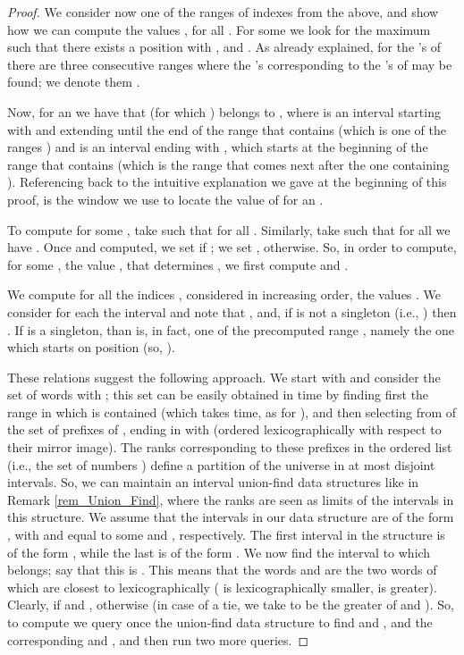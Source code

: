 \documentclass[final]{dmtcs-episciences}
\begin{document}
\begin{proof}
We consider now one of the ranges of indexes  from the above, and show how we can compute the values , for all . For some  we look for the maximum  such that there exists a position  with , and . As already explained, for the 's of  there are three consecutive ranges where the 's corresponding to the 's of  may be found; we denote them . 

Now, for an  we have that  (for which ) belongs to , where  is an interval starting with  and extending until the end of the range that contains  (which is one of the ranges ) and  is an interval ending with , which starts at the beginning of the range that contains  (which is the range that comes next after the one containing ). Referencing back to the intuitive explanation we gave at the beginning of this proof,  is the window we use to locate the value of  for an .  

To compute  for some , take  such that  for all . Similarly, take  such that for all  we have . Once  and  computed, we set  if ; we set , otherwise. So, in order to compute, for some , the value , that determines ,  we first compute  and .

We compute for all the indices , considered in increasing order, the values . 
We consider for each  the interval  and note that , and, if  is not a singleton (i.e., ) then . 
If  is a singleton, than  is, in fact, one of the precomputed range , namely the one which starts on position  (so, ). 
 
These relations suggest the following approach. We start with  and consider the set of words  with ; this set can be easily obtained in  time by finding first the range  in which  is contained (which takes  time, as  for ), and then selecting from  of the set of prefixes  of , ending in  with  (ordered lexicographically with respect to their mirror image). The ranks corresponding to these prefixes in the ordered list  (i.e., the set of numbers ) define a partition of the universe  in at most  disjoint intervals. So, we can maintain an interval union-find data structures like in Remark \ref{rem_Union_Find}, where the ranks are seen as limits of the intervals in this structure. We assume that the intervals in our data structure are of the form , with  and  equal to some  and , respectively. The first interval in the structure is of the form , while the last is of the form . We now find the interval to which  belongs; say that this is . This means that the words  and  are the two words of  which are closest to  lexicographically ( is lexicographically smaller,  is greater). Clearly,  if  and , otherwise (in case of a tie, we take  to be the greater of  and ). So, to compute  we query once the union-find data structure to find  and , and the corresponding  and , and then run two more  queries. 


\end{proof}
\end{document}
